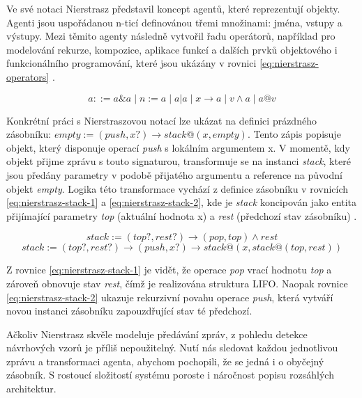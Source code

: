 \documentclass[FM,DP,fonts]{tulthesis}
\begin{document}
Ve své notaci Nierstrasz představil koncept agentů, které reprezentují objekty. Agenti jsou uspořádanou n-ticí definovánou třemi množinami: jména, vstupy a výstupy. Mezi těmito agenty následně vytvořil řadu operátorů, například pro modelování rekurze, kompozice, aplikace funkcí a dalších prvků objektového i funkcionálního programování, které jsou ukázány v rovnici \ref{eq:nierstrasz-operators} \parencite{nierstrasz-object-calculus}.

\begin{equation}\label{eq:nierstrasz-operators}
	a ::= a\&a \mid n := a \mid a|a \mid x \to a \mid v \land a \mid a@v
\end{equation}

Konkrétní práci s Nierstraszovou notací lze ukázat na definici prázdného zásobníku: $empty := (push, x?) \to stack@(x, empty)$. Tento zápis popisuje objekt, který disponuje operací \textit{push} s lokálním argumentem x. V momentě, kdy objekt přijme zprávu s touto signaturou, transformuje se na instanci \textit{stack}, které jsou předány parametry v podobě přijatého argumentu a reference na původní objekt \textit{empty}. Logika této transformace vychází z definice zásobníku v rovnicích \ref{eq:nierstrasz-stack-1} a \ref{eq:nierstrasz-stack-2}, kde je \textit{stack} koncipován jako entita přijímající parametry \textit{top} (aktuální hodnota x) a \textit{rest} (předchozí stav zásobníku) \parencite{nierstrasz-object-calculus}.

\begin{equation}\label{eq:nierstrasz-stack-1}
	stack := (top?, rest?) \to (pop, top) \land rest
\end{equation}
\begin{equation}\label{eq:nierstrasz-stack-2}
	stack := (top?, rest?) \to (push, x?) \to stack@\left(x, stack@(top, rest)\right)
\end{equation}

Z rovnice \ref{eq:nierstrasz-stack-1} je vidět, že operace \textit{pop} vrací hodnotu \textit{top} a zároveň obnovuje stav \textit{rest}, čímž je realizována struktura LIFO. Naopak rovnice \ref{eq:nierstrasz-stack-2} ukazuje rekurzivní povahu operace \textit{push}, která vytváří novou instanci zásobníku zapouzdřující stav té předchozí.

Ačkoliv Nierstrasz skvěle modeluje předávání zpráv, z pohledu detekce návrhových vzorů je příliš nepoužitelný. Nutí nás sledovat každou jednotlivou zprávu a transformaci agenta, abychom pochopili, že se jedná i o obyčejný zásobník. S rostoucí složitostí systému poroste i náročnost popisu rozsáhlých architektur.
\end{document}
